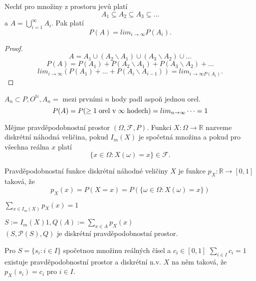 \documentclass[../main.tex]{subfiles}
\begin{document}
\begin{definition}
    Nechť pro množiny z prostoru jevů platí
    \[A_1 \subseteq A_2 \subseteq A_3 \subseteq \dots\]
    a $A = \bigcup^\infty_{i=1}A_i$. Pak platí
    \[P(A) = lim_{i\rightarrow \infty} P(A_i).\]
    \begin{proof}
        \[A = A_1 \cup (A_2\backslash A_1)\cup (A_3\backslash A_2) \cup \dots\]
        \[P(A) = P(A_1) + P(A_2\backslash A_1) + P(A_3\backslash A_2) + \dots\]
        \[lim_{i\rightarrow \infty} (P(A_1) + \dots + P(A_i \backslash A_{i-1})) = lim_{i\rightarrow \infty P(A_i)}.\]
    \end{proof}
 
    $A_n \subset {P,O}^\mathbb{N}, A_n = $ mezi prvními $n$ hody padl aspoň jednou orel.
    \[P(A) = P(\geq 1 \hspace{1mm} \text{orel v} \hspace{1mm} \infty \hspace{1mm} \text{hodech}) = lim_{n\rightarrow \infty} \dots = 1\]
\end{definition}

\begin{definition}
    Mějme pravděpodobnostní prostor $(\Omega, \mathcal{F}, P).$ Funkci $X : \Omega \rightarrow \mathbb{R}$
    nazveme diskrétní náhodná veličina, pokud $I_m(X)$ je spočetná množina a pokud pro všechna reálna $x$ platí
    \[\{x \in \Omega : X(\omega) = x\} \in \mathcal{F}.\]
\end{definition}

\begin{definition}
    Pravděpodobnostní funkce diskrétní náhodné veličiny $X$ je funkce $p_X : \mathbb{R} \rightarrow [0,1]$ taková, že 
    \[p_X(x) = P(X = x) = P(\{\omega \in \Omega : X(\omega) = x\})\]
\end{definition}

\begin{definition}
    $\sum_{x\in I_m(X)}p_X(x) = 1$
\end{definition}

\begin{definition}
    $S:= I_m(X) 1, Q(A):=\sum_{x\in A} p_X(x)$\\
    $(S,\mathcal{P}(S),Q)$ je diskrétní pravděpodobnostní prostor.
\end{definition}

\begin{definition}
    Pro $S = \{s_i : i \in I\}$ spočetnou množinu reálných čísel a $c_i \in [0,1]$ $\sum_{i\in I} c_i =1$ existuje pravděpodobnostní
    prostor a diskrétní n.v. $X$ na něm taková, že $p_X(s_i) = c_i$ pro $i \in I$.
\end{definition}
\end{document}
